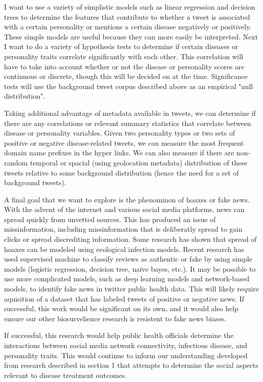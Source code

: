 I want to use a variety of simplistic models such as linear regression and decision trees to determine the features that contribute to whether a tweet is associated with a certain personality or mentions a certain disease negatively or positively. These simple models are useful because they can more easily be interpreted. Next I want to do a variety of hypothesis tests to determine if certain diseases or personality traits correlate significantly with each other. This correlation will have to take into account whether or not the disease or personality scores are continuous or discrete, though this will be decided on at the time. Significance tests will use the background tweet corpus described above as an empirical "null distribution".

Taking additional advantage of metadata available in tweets, we can determine if there are any correlations or relevant summary statistics that correlate between disease or personality variables. Given two personality types or two sets of positive or negative disease-related tweets, we can measure the most frequent domain name prefixes in the hyper links. We can also measure if there are non-random temporal or spacial (using geolocation metadata) distribution of these tweets relative to some background distribution (hence the need for a set of background tweets).

A final goal that we want to explore is the phenominon of hoaxes or fake news. With the advent of the internet and various social media platforms, news can spread quickly from unvetted sources. This has produced an issue of missinformation, including missinformation that is deliberatly spread to gain clicks or spread discrediting information. Some research has shown that spread of hoaxes can be modeled using ecological infection models\cite{tambuscio2015fact}. Recent research has used supervised machine to classify reviews as authentic or fake\cite{banerjee2015using} by using simple models (logistic regression, decision tree, naive bayes, etc.). It may be possible to use more complicated models, such as deep learning models and network-based models, to identify fake news in twitter public health data. This will likely require aquisition of a dataset that has labeled tweets of positive or negative news. If successful, this work would be significant on its own, and it would also help ensure our other biosurvelience research is resistent to fake news biases.

If successful, this research would help public health officials determine the interactions between social media network connectivity, infectious disease, and personality traits. This would continue to inform our understanding developed from research described in section 1 that attempts to determine the social aspects relevant to disease treatment outcomes.

